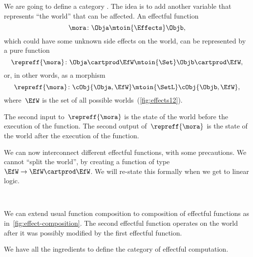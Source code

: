 We are going to define a category \Effects.
The idea is to add another variable that represents ``the world'' that can be affected.
An effectful function
%
\begin{equation}
    \mora\colon \Obja \mtoin{\Effects} \Objb,
\end{equation}
%
which could have some unknown side effects on the world, can be represented by a pure function
\begin{equation}
    \repreff{\mora}\colon \Obja \cartprod \EfW \mtoin{\Set} \Objb \cartprod \EfW,
\end{equation}
or, in other words, as a morphism
\begin{equation}
    \repreff{\mora}\colon \cObj{\Obja,\EfW} \mtoin{\SetL} \cObj{\Objb, \EfW},
\end{equation}
%
where~$\EfW$ is the set of all possible worlds~(\cref{fig:effects12}).

The second input to~$\repreff{\mora}$ is the state of the world before the execution of the function.
The second output of~$\repreff{\mora}$ is the state of the world after the execution of the function.

We can now interconnect different effectful functions, with some precautions.
We cannot ``split the world'', by creating a function of type~$\EfW \to \EfW \cartprod \EfW$.
We will re-state this formally when we get to linear logic.

\begin{marginfigure}
    \centering
    \\
    \caption{}
    \label{fig:effect-composition}
\end{marginfigure}

We can extend usual function composition to composition of effectful functions as in~\cref{fig:effect-composition}.
The second effectful function operates on the world after it was possibly modified by the first effectful function.

We have all the ingredients to define the category \Effects of effectful computation.

